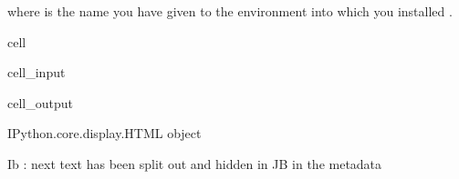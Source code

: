 \documentclass[letterpaper,10pt,english]{jupyterBook}
\begin{document}
\begin{sphinxVerbatim}[commandchars=\\\{\}]
  
\end{sphinxVerbatim}

\sphinxAtStartPar
where  is the name you have given to the  environment into which you installed .

\begin{sphinxuseclass}{cell}\begin{sphinxVerbatimInput}

\begin{sphinxuseclass}{cell_input}
\begin{sphinxVerbatim}[commandchars=\\\{\}]
    
        

   

   
\end{sphinxVerbatim}

\end{sphinxuseclass}\end{sphinxVerbatimInput}
\begin{sphinxVerbatimOutput}

\begin{sphinxuseclass}{cell_output}
\begin{sphinxVerbatim}[commandchars=\\\{\}]
\PYGZlt{}IPython.core.display.HTML object\PYGZgt{}
\end{sphinxVerbatim}

\end{sphinxuseclass}\end{sphinxVerbatimOutput}

\end{sphinxuseclass}
\sphinxAtStartPar
Ib : next text has been split out and hidden in JB in the metadata  
\end{document}
